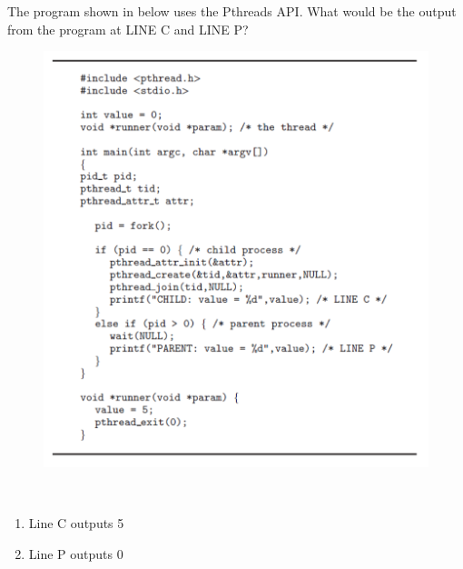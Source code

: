 



\begin{exercise}[]{The program shown in below uses the Pthreads API. What would be the output from the program at LINE C and LINE P?   
    \begin{figure}[t]
        \begin{center}
            \includegraphics[scale=0.8]{aa1.pdf}
        \end{center}
    \end{figure}}
  \begin{solution}
  \par{~}
  \begin{enumerate}
      \item Line C outputs 5
      \item Line P outputs 0
  \end{enumerate}
  \end{solution}
  \label{ex3}
\end{exercise}

